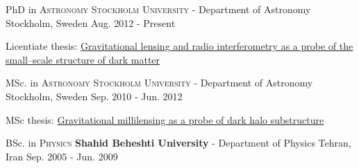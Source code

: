 \begin{cventries}
  \cventry
    {\normalsize PhD in \textsc{Astronomy}}
    {\textsc{Stockholm University} - Department of Astronomy}
    {\normalsize Stockholm, Sweden}
    {\normalsize Aug. 2012 - Present}
    {
        \begin{cvitems}
                \item \normalsize {Licentiate thesis: \href{http://asadisaghar.github.io/Licentiate-thesis/}{Gravitational lensing and radio interferometry as a probe of the small--scale structure of dark matter}}
        \end{cvitems}
    }
  \cventry
    {\normalsize MSc. in \textsc{Astronomy}}
    {\textsc{Stockholm University} - Department of Astronomy}
    {\normalsize Stockholm, Sweden}
    {\normalsize Sep. 2010 - Jun. 2012}
    {
        \begin{cvitems}
                \item \normalsize {MSc thesis: \href{http://asadisaghar.github.io/MSc-thesis/}{Gravitational millilensing as a probe of dark halo substructure}}
        \end{cvitems}
    }
  \cventry
    {\normalsize BSc. in \textsc{Physics}}
    {\textbf{Shahid Beheshti University} - Department of Physics}
    {\normalsize Tehran, Iran}
    {\normalsize Sep. 2005 - Jun. 2009}
    {}
\end{cventries}

